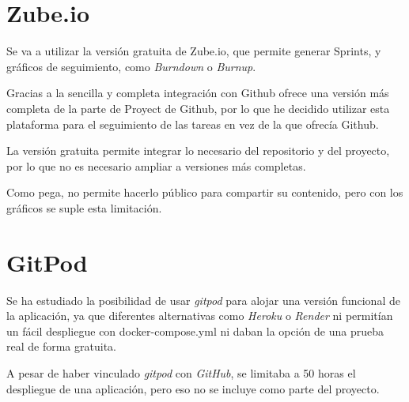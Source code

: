 \section{Zube.io}

Se va a utilizar la versión gratuita de Zube.io, que permite generar Sprints, y gráficos de seguimiento, como \textit{Burndown} o \textit{Burnup}.

Gracias a la sencilla y completa integración con Github ofrece una versión más completa de la parte de Proyect de Github, por lo que he decidido utilizar esta plataforma para el seguimiento de las tareas en vez de la que ofrecía Github.

La versión gratuita permite integrar lo necesario del repositorio y del proyecto, por lo que no es necesario ampliar a versiones más completas.

Como pega, no permite hacerlo público para compartir su contenido, pero con los gráficos se suple esta limitación.

\section{GitPod}

Se ha estudiado la posibilidad de usar \textit{gitpod} para alojar una versión funcional de la aplicación, ya que diferentes alternativas como \textit{Heroku} o \textit{Render} ni permitían un fácil despliegue con docker-compose.yml ni daban la opción de una prueba real de forma gratuita.

A pesar de haber vinculado \textit{gitpod} con \textit{GitHub}, se limitaba a 50 horas el despliegue de una aplicación, pero eso no se incluye como parte del proyecto.








